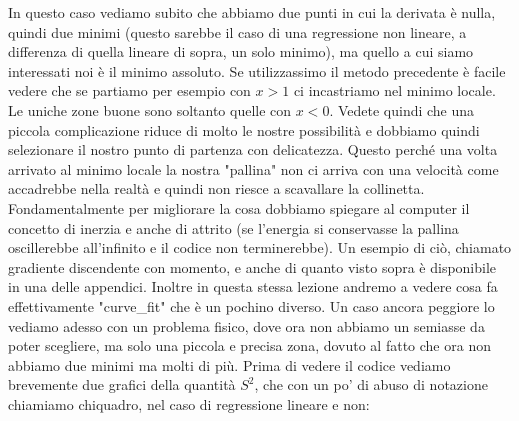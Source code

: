 \documentclass[10pt,a4paper]{article}
\begin{document}
\begin{center}
\end{center}
In questo caso vediamo subito che abbiamo due punti in cui la derivata è nulla, quindi due minimi (questo sarebbe il caso di una regressione non lineare, a differenza di quella lineare di sopra, un solo minimo), ma quello a cui siamo interessati noi è il minimo assoluto. Se utilizzassimo il metodo precedente è facile vedere che se partiamo per esempio con $x>1$ ci incastriamo nel minimo locale. Le uniche zone buone sono soltanto quelle con $x<0$. Vedete quindi che una piccola complicazione riduce di molto le nostre possibilità e dobbiamo quindi selezionare il nostro punto di partenza con delicatezza. Questo perché una volta arrivato al minimo locale la nostra "pallina" non ci arriva con una velocità come accadrebbe nella realtà e quindi non riesce a scavallare la collinetta. Fondamentalmente per migliorare la cosa dobbiamo spiegare al computer il concetto di inerzia e anche di attrito (se l'energia si conservasse la pallina oscillerebbe all'infinito e il codice non terminerebbe). Un esempio di ciò, chiamato gradiente discendente con momento, e anche di quanto visto sopra è disponibile in una delle appendici. Inoltre in questa stessa lezione andremo a vedere cosa fa effettivamente "curve\_fit" che è un pochino diverso. Un caso ancora peggiore lo vediamo adesso con un problema fisico, dove ora non abbiamo un semiasse da poter scegliere, ma solo una piccola e precisa zona, dovuto al fatto che ora non abbiamo due minimi ma molti di più.
Prima di vedere il codice vediamo brevemente due grafici della quantità $S^2$, che con un po' di abuso di notazione chiamiamo chiquadro, nel caso di regressione lineare e non:
\end{document}
